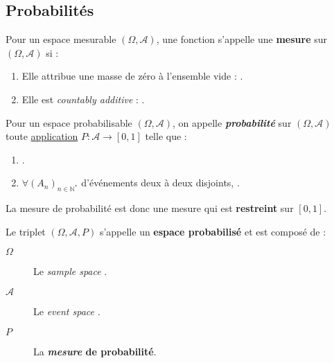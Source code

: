 \documentclass[10pt, french]{article}
\begin{document}
\begin{multicols*}{2}
\subsection{Probabilités}
\begin{definitionNOHFILL}[Mesure]
Pour un espace mesurable $(\Omega, \mathcal{A})$, une fonction  s'appelle une \textbf{mesure} sur $(\Omega, \mathcal{A})$ si :
\begin{enumerate}
	\item	Elle attribue une masse de zéro à l'ensemble vide : .
	\item	Elle est \og \textit{countably additive} \fg{} : .
\end{enumerate}
\end{definitionNOHFILL}


\begin{definitionNOHFILLsub}
Pour un espace probabilisable $(\Omega, \mathcal{A})$, on appelle \textbf{\textit{probabilité}} sur $(\Omega, \mathcal{A})$ toute \underline{application} $P: \mathcal{A} \rightarrow [0, 1]$ telle que :
\begin{enumerate}[label = \roman*)]
	\item	{}.
	\item	$\forall (A_{n})_{n \in \mathbb{N}^{\ast}}$ d'événements deux à deux disjoints, .
\end{enumerate}

\bigskip

La mesure de probabilité est donc une mesure qui est \textbf{restreint} sur $[0, 1]$.
\end{definitionNOHFILLsub}

\begin{definitionNOHFILL}
Le triplet $(\Omega, \mathcal{A}, P)$ s'appelle un \textbf{espace probabilisé} et est composé de : 
\begin{description}
	\item[$\Omega$]	Le \og \textit{sample space} \fg{}.
	\item[$\mathcal{A}$]	Le \og \textit{event space} \fg{}.
	\item[$P$]	La \textbf{\textit{mesure} de probabilité}.
\end{description}


\end{definitionNOHFILL}
\end{multicols*}
\end{document}
